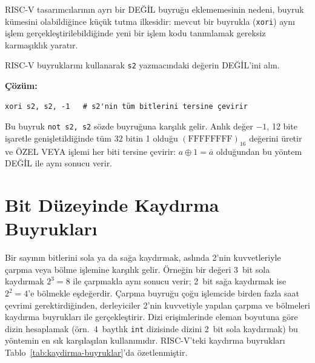 RISC-V tasarımcılarının ayrı bir DEĞİL buyruğu eklememesinin nedeni, buyruk kümesini olabildiğince küçük tutma ilkesidir: mevcut bir buyrukla (\texttt{xori}) aynı işlem gerçekleştirilebildiğinde yeni bir işlem kodu tanımlamak gereksiz karmaşıklık yaratır.

\begin{ornek}[3.13]
RISC-V buyruklarını kullanarak \texttt{s2} yazmacındaki değerin DEĞİL'ini alın.

\textbf{Çözüm:}
\begin{lstlisting}[style=riscv]
xori s2, s2, -1   # s2'nin tüm bitlerini tersine çevirir
\end{lstlisting}

Bu buyruk \texttt{not s2, s2} sözde buyruğuna karşılık gelir. Anlık değer $-1$, 12 bite işaretle genişletildiğinde tüm 32 bitin 1 olduğu $(\text{FFFFFFFF})_{16}$ değerini üretir ve ÖZEL VEYA işlemi her biti tersine çevirir: $a \oplus 1 = \overline{a}$ olduğundan bu yöntem DEĞİL ile aynı sonucu verir.
\end{ornek}


\section{Bit Düzeyinde Kaydırma Buyrukları}
\label{sec:kaydirma-buyruklar}

Bir sayının bitlerini sola ya da sağa kaydırmak, aslında 2'nin kuvvetleriyle çarpma veya bölme işlemine karşılık gelir. Örneğin bir değeri 3~bit sola kaydırmak $2^3 = 8$ ile çarpmakla aynı sonucu verir; 2~bit sağa kaydırmak ise $2^2 = 4$'e bölmekle eşdeğerdir. Çarpma buyruğu çoğu işlemcide birden fazla saat çevrimi gerektirdiğinden, derleyiciler 2'nin kuvvetiyle yapılan çarpma ve bölmeleri kaydırma buyrukları ile gerçekleştirir. Dizi erişimlerinde eleman boyutuna göre dizin hesaplamak (örn.\ 4~baytlık \texttt{int} dizisinde dizini 2~bit sola kaydırmak) bu yöntemin en sık karşılaşılan kullanımıdır. RISC-V'teki kaydırma buyrukları Tablo~\ref{tab:kaydirma-buyruklar}'da özetlenmiştir.

